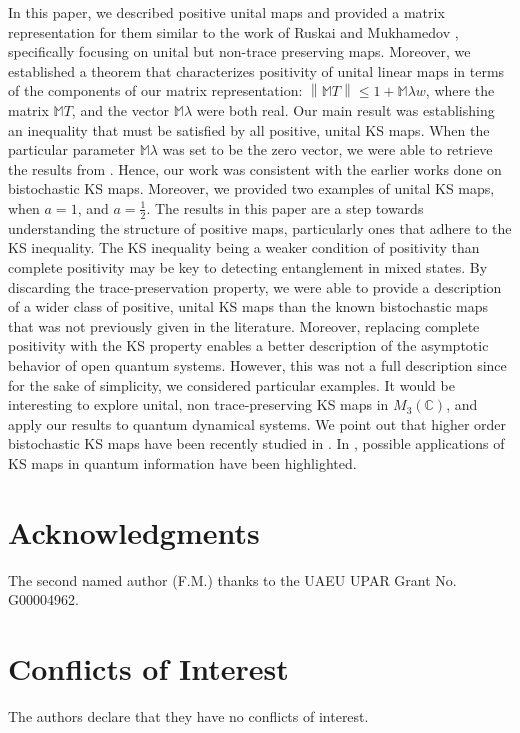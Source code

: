 \documentclass[11pt,reqno]{amsart}
\theoremstyle{definition}
\numberwithin{equation}{section} \setcounter{tocdepth}{1}
\def\bm{{\mathbb M}}
\newcommand{\norm}[1]{\left \lVert #1 \right \rVert}
\numberwithin{equation}{section}
\begin{document}
In this paper, we described positive unital maps and provided a matrix representation for them similar to the work of Ruskai \cite{king_minimal_2001} and Mukhamedov \cite{MA2010}, specifically focusing on unital but non-trace preserving maps. Moreover, we established a theorem that characterizes positivity of unital linear maps in terms of the components of our matrix representation: $\norm{\bm{T}} \leq 1+\bm{\lambda w}$, where the matrix $\bm{T}$, and the vector $\bm{\lambda}$ were both real. Our main result was establishing an inequality that must be satisfied by all positive, unital KS maps. When the particular parameter $\bm{\lambda}$ was set to be the zero vector, we were able to retrieve the results from \cite{KS,MA2010}. Hence, our work was consistent with the earlier works done on bistochastic KS maps. Moreover, we provided two examples of unital KS maps, when $a=1$, and $a=\frac{1}{2}$. The results in this paper are a step towards understanding the structure of positive maps, particularly ones that adhere to the KS inequality. The KS inequality being a weaker condition of positivity than complete positivity may be key to detecting entanglement in mixed states. By discarding the trace-preservation property, we were able to provide a description of a wider class of positive, unital KS maps than the known bistochastic maps that was not previously given in the literature. Moreover, replacing complete positivity with the KS property enables a better description of the asymptotic behavior of open quantum systems. However, this was not a full description since for the sake of simplicity, we considered particular examples. It would be interesting to explore unital, non trace-preserving KS maps in $M_3(\mathbb{C})$, and apply our results to quantum dynamical systems. We point out that higher order bistochastic KS maps have been recently studied in \cite{CMH20,Sun}. In \cite{CMH20}, possible applications of KS maps in quantum information have been highlighted.



\section*{Acknowledgments}
The second named author (F.M.) thanks to the UAEU UPAR Grant No. G00004962.


\section*{Conflicts of Interest} The authors declare that they have no conflicts of interest.
\end{document}
